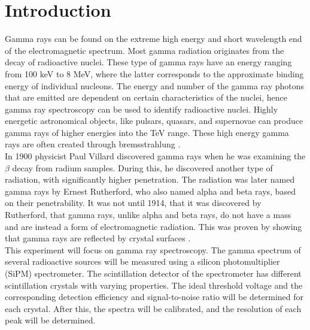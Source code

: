 \documentclass[a4paper, 11pt, table]{article}
\begin{document}
\begingroup
\hypersetup{linkcolor=black}
\setlength{\parskip}{0em}
\par
\tableofcontents
\endgroup
\newpage

\section{Introduction}

Gamma rays can be found on the extreme high energy and short wavelength end of the electromagnetic spectrum. Most gamma radiation originates from the decay of radioactive nuclei. These type of gamma rays have an energy ranging from 100 keV to 8 MeV, where the latter corresponds to the approximate binding energy of individual nucleons. The energy and number of the gamma ray photons that are emitted are dependent on certain characteristics of the nuclei, hence gamma ray spectroscopy can be used to identify radioactive nuclei. Highly energetic astronomical objects, like pulsars, quasars, and supernovae can produce gamma rays of higher energies into the TeV range. These high energy gamma rays are often created through bremsstrahlung \cite{meyers_gamma-ray_2003}.\\

In 1900 physicist Paul Villard discovered gamma rays when he was examining the $\beta$ decay from radium samples. During this, he discovered another type of radiation, with significantly higher penetration. The radiation was later named gamma rays by Ernest Rutherford, who also named alpha and beta rays, based on their penetrability. It was not until 1914, that it was discovered by Rutherford, that gamma rays, unlike alpha and beta rays, do not have a mass and are instead a form of electromagnetic radiation. This was proven by showing that gamma rays are reflected by crystal surfaces \cite{lannunziata_radioactivity_2007}.\\


This experiment will focus on gamma ray spectroscopy. The gamma spectrum of several radioactive sources will be measured using a silicon photomultiplier (SiPM) spectrometer. The scintillation detector of the spectrometer has different scintillation crystals with varying properties. The ideal threshold voltage and the corresponding detection efficiency and signal-to-noise ratio will be determined for each crystal. After this, the spectra will be calibrated, and the resolution of each peak will be determined.
\end{document}
